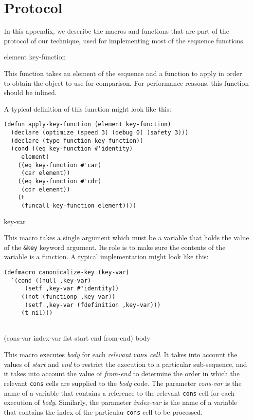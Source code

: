 \appendix

\section{Protocol}

In this appendix, we describe the macros and functions that are part
of the protocol of our technique, used for implementing most of the
sequence functions.

 {element key-function}

This function takes an element of the sequence and a function to apply
in order to obtain the object to use for comparison.  For performance
reasons, this function should be inlined.

A typical definition of this function might look like this:

{\small\begin{verbatim}
(defun apply-key-function (element key-function)
  (declare (optimize (speed 3) (debug 0) (safety 3)))
  (declare (type function key-function))
  (cond ((eq key-function #'identity)
	 element)
	((eq key-function #'car)
	 (car element))
	((eq key-function #'cdr)
	 (cdr element))
	(t
	 (funcall key-function element))))
\end{verbatim}}

 {key-var}

This macro takes a single argument which must be a variable that holds
the value of the \texttt{\&key} keyword argument.  Its role is to make
sure the contents of the variable is a function.  A typical
implementation might look like this:

{\small\begin{verbatim}
(defmacro canonicalize-key (key-var)
  `(cond ((null ,key-var)
	  (setf ,key-var #'identity))
	 ((not (functionp ,key-var))
	  (setf ,key-var (fdefinition ,key-var)))
	 (t nil)))
\end{verbatim}}

\\
{(cons-var index-var list start end from-end) \body body}

This macro executes \textit{body} for each \emph{relevant
  \texttt{cons} cell}.  It takes into account the values of
\textit{start} and \textit{end} to restrict the execution to a
particular sub-sequence, and it takes into account the value of
\textit{from-end} to determine the order in which the relevant
\texttt{cons} cells are supplied to the \textit{body} code.  The
parameter \textit{cons-var} is the name of a variable that contains a
reference to the relevant \texttt{cons} cell for each execution of
\textit{body}.  Similarly, the parameter \textit{index-var} is the
name of a variable that contains the index of the particular
\texttt{cons} cell to be processed.

